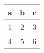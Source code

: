 \begin{tabular}{|c|c|c|}
\hline
a & b & c \\
\hline
1 & 2 & 3 \\
\hline
4 & 5 & 6 \\
\hline
\end{tabular}